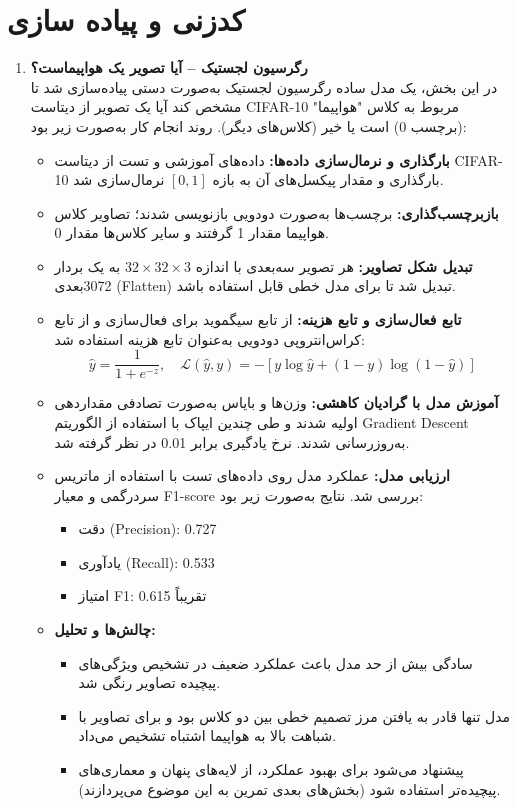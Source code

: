 \section{ کدزنی و پیاده سازی‬}
\begin{enumerate}
	\item \textbf{رگرسیون لجستیک – آیا تصویر یک هواپیماست؟} \\
		در این بخش، یک مدل ساده رگرسیون لجستیک به‌صورت دستی پیاده‌سازی شد تا مشخص کند آیا یک تصویر از دیتاست CIFAR-10 مربوط به کلاس "هواپیما" (برچسب 0) است یا خیر (کلاس‌های دیگر). روند انجام کار به‌صورت زیر بود:
		
	\begin{itemize}
		\item \textbf{بارگذاری و نرمال‌سازی داده‌ها:} داده‌های آموزشی و تست از دیتاست CIFAR-10 بارگذاری و مقدار پیکسل‌های آن به بازه $[0,1]$ نرمال‌سازی شد.
			
		\item \textbf{بازبرچسب‌گذاری:} برچسب‌ها به‌صورت دودویی بازنویسی شدند؛ تصاویر کلاس هواپیما مقدار 1 گرفتند و سایر کلاس‌ها مقدار 0.
			
		\item \textbf{تبدیل شکل تصاویر:} هر تصویر سه‌بعدی با اندازه $32 \times 32 \times 3$ به یک بردار 3072‌بعدی (Flatten) تبدیل شد تا برای مدل خطی قابل استفاده باشد.
			
		\item \textbf{تابع فعال‌سازی و تابع هزینه:} از تابع سیگموید برای فعال‌سازی و از تابع کراس‌انتروپی دودویی به‌عنوان تابع هزینه استفاده شد:
			\[
			\hat{y} = \frac{1}{1 + e^{-z}}, \quad
			\mathcal{L}(\hat{y}, y) = -[y \log \hat{y} + (1-y) \log (1-\hat{y})]
			\]
			
		\item \textbf{آموزش مدل با گرادیان کاهشی:} وزن‌ها و بایاس به‌صورت تصادفی مقداردهی اولیه شدند و طی چندین ایپاک با استفاده از الگوریتم Gradient Descent به‌روزرسانی شدند. نرخ یادگیری برابر 0.01 در نظر گرفته شد.
			
		\item \textbf{ارزیابی مدل:} عملکرد مدل روی داده‌های تست با استفاده از ماتریس سردرگمی و معیار F1-score بررسی شد. نتایج به‌صورت زیر بود:
		\begin{itemize}
			\item دقت (Precision): 0.727
			\item یادآوری (Recall): 0.533
			\item امتیاز F1: تقریباً 0.615
		\end{itemize}
			
		\item \textbf{چالش‌ها و تحلیل:}
		\begin{itemize}
			\item سادگی بیش از حد مدل باعث عملکرد ضعیف در تشخیص ویژگی‌های پیچیده تصاویر رنگی شد.
			\item مدل تنها قادر به یافتن مرز تصمیم خطی بین دو کلاس بود و برای تصاویر با شباهت بالا به هواپیما اشتباه تشخیص می‌داد.
			\item پیشنهاد می‌شود برای بهبود عملکرد، از لایه‌های پنهان و معماری‌های پیچیده‌تر استفاده شود (بخش‌های بعدی تمرین به این موضوع می‌پردازند).
		\end{itemize}
	\end{itemize}
		

\end{enumerate}
